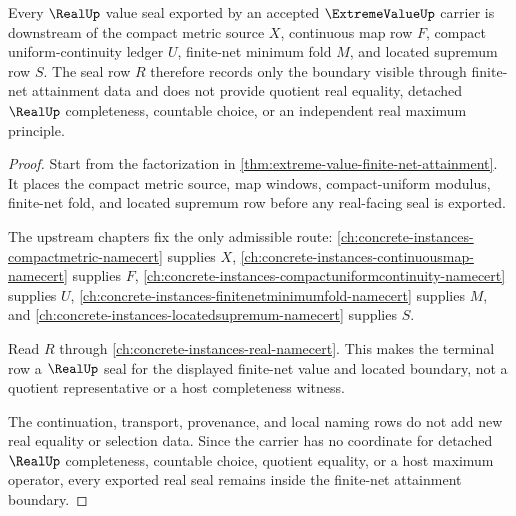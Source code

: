 \begin{theorem}
\label{thm:extreme-value-real-seal-boundary}
Every $\RealUp$ value seal exported by an accepted $\ExtremeValueUp$ carrier is downstream of the compact metric source $X$, continuous map row $F$, compact uniform-continuity ledger $U$, finite-net minimum fold $M$, and located supremum row $S$. The seal row $R$ therefore records only the boundary visible through finite-net attainment data and does not provide quotient real equality, detached $\RealUp$ completeness, countable choice, or an independent real maximum principle.
\end{theorem}
\begin{proof}
Start from the factorization in \autoref{thm:extreme-value-finite-net-attainment}. It places the compact metric source, map windows, compact-uniform modulus, finite-net fold, and located supremum row before any real-facing seal is exported.

The upstream chapters fix the only admissible route: \autoref{ch:concrete-instances-compactmetric-namecert} supplies $X$, \autoref{ch:concrete-instances-continuousmap-namecert} supplies $F$, \autoref{ch:concrete-instances-compactuniformcontinuity-namecert} supplies $U$, \autoref{ch:concrete-instances-finitenetminimumfold-namecert} supplies $M$, and \autoref{ch:concrete-instances-locatedsupremum-namecert} supplies $S$.

Read $R$ through \autoref{ch:concrete-instances-real-namecert}. This makes the terminal row a $\RealUp$ seal for the displayed finite-net value and located boundary, not a quotient representative or a host completeness witness.

The continuation, transport, provenance, and local naming rows do not add new real equality or selection data. Since the carrier has no coordinate for detached $\RealUp$ completeness, countable choice, quotient equality, or a host maximum operator, every exported real seal remains inside the finite-net attainment boundary.
\end{proof}

